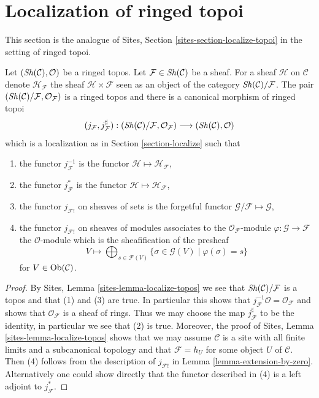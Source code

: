 \section{Localization of ringed topoi}
\label{section-localize-ringed-topoi}

\noindent
This section is the analogue of
Sites, Section \ref{sites-section-localize-topoi}
in the setting of ringed topoi.

\begin{lemma}
\label{lemma-localize-ringed-topos}
Let $(\mathop{\mathit{Sh}}\nolimits(\mathcal{C}), \mathcal{O})$ be a ringed topos.
Let $\mathcal{F} \in \mathop{\mathit{Sh}}\nolimits(\mathcal{C})$ be a sheaf.
For a sheaf $\mathcal{H}$ on $\mathcal{C}$ denote
$\mathcal{H}_\mathcal{F}$ the sheaf $\mathcal{H} \times \mathcal{F}$
seen as an object of the category $\mathop{\mathit{Sh}}\nolimits(\mathcal{C})/\mathcal{F}$.
The pair
$(\mathop{\mathit{Sh}}\nolimits(\mathcal{C})/\mathcal{F}, \mathcal{O}_\mathcal{F})$
is a ringed topos and there is a canonical morphism of ringed topoi
$$
(j_\mathcal{F}, j_\mathcal{F}^\sharp) :
(\mathop{\mathit{Sh}}\nolimits(\mathcal{C})/\mathcal{F}, \mathcal{O}_\mathcal{F})
\longrightarrow
(\mathop{\mathit{Sh}}\nolimits(\mathcal{C}), \mathcal{O})
$$
which is a localization as in
Section \ref{section-localize}
such that
\begin{enumerate}
\item the functor $j_\mathcal{F}^{-1}$ is the functor
$\mathcal{H} \mapsto \mathcal{H}_\mathcal{F}$,
\item the functor $j_\mathcal{F}^*$ is the functor
$\mathcal{H} \mapsto \mathcal{H}_\mathcal{F}$,
\item the functor $j_{\mathcal{F}!}$ on sheaves of sets is the forgetful
functor $\mathcal{G}/\mathcal{F} \mapsto \mathcal{G}$,
\item the functor $j_{\mathcal{F}!}$ on sheaves of modules associates
to the $\mathcal{O}_\mathcal{F}$-module
$\varphi : \mathcal{G} \to \mathcal{F}$ the $\mathcal{O}$-module
which is the sheafification of the presheaf
$$
V \longmapsto
\bigoplus\nolimits_{s \in \mathcal{F}(V)}
\{\sigma \in \mathcal{G}(V) \mid \varphi(\sigma) = s \}
$$
for $V \in \mathop{\mathrm{Ob}}\nolimits(\mathcal{C})$.
\end{enumerate}
\end{lemma}

\begin{proof}
By
Sites, Lemma \ref{sites-lemma-localize-topos}
we see that $\mathop{\mathit{Sh}}\nolimits(\mathcal{C})/\mathcal{F}$ is a topos
and that (1) and (3) are true. In particular this shows that
$j_\mathcal{F}^{-1}\mathcal{O} = \mathcal{O}_\mathcal{F}$
and shows that $\mathcal{O}_\mathcal{F}$ is a sheaf of rings.
Thus we may choose the map $j_\mathcal{F}^\sharp$ to be the identity,
in particular we see that (2) is true.
Moreover, the proof of
Sites, Lemma \ref{sites-lemma-localize-topos}
shows that we may assume $\mathcal{C}$ is a site with all finite limits
and a subcanonical topology and that $\mathcal{F} = h_U$ for some object
$U$ of $\mathcal{C}$.
Then (4) follows from the description of $j_{\mathcal{F}!}$ in
Lemma \ref{lemma-extension-by-zero}.
Alternatively one could show directly that the functor described
in (4) is a left adjoint to $j_\mathcal{F}^*$.
\end{proof}

